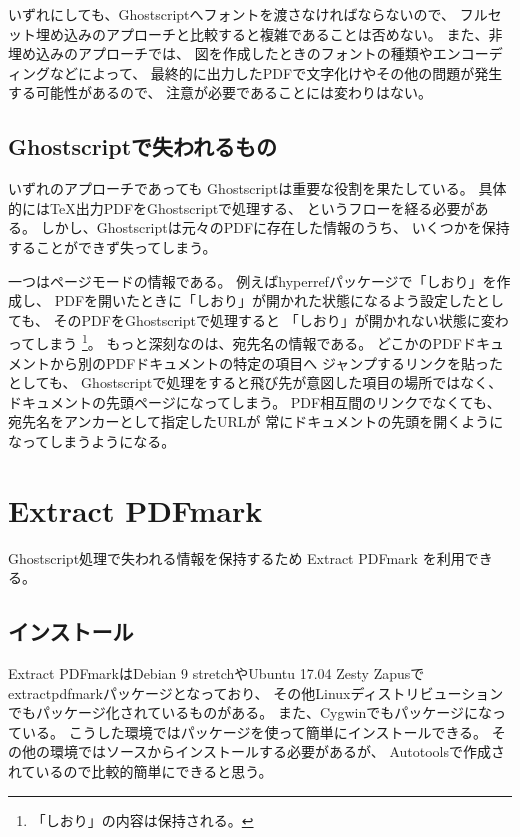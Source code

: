 \documentclass[twocolumn,jafontscale=0.962216,jlreq_notes]{jlreq}
\begin{document}
いずれにしても、Ghostscriptへフォントを渡さなければならないので、
フルセット埋め込みのアプローチと比較すると複雑であることは否めない。
また、非埋め込みのアプローチでは、
図を作成したときのフォントの種類やエンコーディングなどによって、
最終的に出力したPDFで文字化けやその他の問題が発生する可能性があるので、
注意が必要であることには変わりはない。

\subsection{Ghostscriptで失われるもの}

いずれのアプローチであっても
Ghostscriptは重要な役割を果たしている。
具体的には\TeX 出力PDFをGhostscriptで処理する、
というフローを経る必要がある。
しかし、Ghostscriptは元々のPDFに存在した情報のうち、
いくつかを保持することができず失ってしまう。

一つはページモードの情報である。
例えばhyperrefパッケージで「しおり」を作成し、
PDFを開いたときに「しおり」が開かれた状態になるよう設定したとしても、
そのPDFをGhostscriptで処理すると
「しおり」が開かれない状態に変わってしまう
\footnote{「しおり」の内容は保持される。}。
もっと深刻なのは、宛先名の情報である。
どこかのPDFドキュメントから別のPDFドキュメントの特定の項目へ
ジャンプするリンクを貼ったとしても、
Ghostscriptで処理をすると飛び先が意図した項目の場所ではなく、
ドキュメントの先頭ページになってしまう。
PDF相互間のリンクでなくても、宛先名をアンカーとして指定したURLが
常にドキュメントの先頭を開くようになってしまうようになる。

\section{Extract PDFmark}

Ghostscript処理で失われる情報を保持するため
Extract PDFmark \cite{extractpdfmark}を利用できる。

\subsection{インストール}

Extract PDFmarkはDebian 9 stretchやUbuntu 17.04 Zesty Zapusで
extractpdfmarkパッケージとなっており、
その他Linuxディストリビューションでもパッケージ化されているものがある。
また、Cygwinでもパッケージになっている。
こうした環境ではパッケージを使って簡単にインストールできる。
その他の環境ではソースからインストールする必要があるが、
Autotoolsで作成されているので比較的簡単にできると思う。
\end{document}
